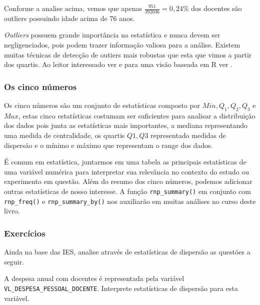 \documentclass[11pt,]{style/krantz}
\renewenvironment{quote}{\begin{VF}}{\end{VF}}
\theoremstyle{definition}
\theoremstyle{definition}
\theoremstyle{definition}
\theoremstyle{remark}
\let\BeginKnitrBlock\begin \let\EndKnitrBlock\end
\begin{document}
Conforme a analise acima, vemos que apenas \(\frac{951}{392036} = 0,24\%\) dos docentes são outliers possuindo idade acima de 76 anos.

\begin{quote}
\emph{Outliers} possuem grande importância na estatística e nunca devem ser negligenciados, pois podem trazer informação valiosa para a análise. Existem muitas técnicas de detecção de outiers mais robustas que esta que vimos a partir dos quartis. Ao leitor interessado ver \citep{barnett1974outliers} e para uma visão baseada em R ver \citep{outliers}.
\end{quote}

\hypertarget{os-cinco-numeros}{%
\subsubsection{Os cinco números}\label{os-cinco-numeros}}

Os cinco números são um conjunto de estatísticas composto por \(Min, Q_1,Q_2,Q_3\) e \(Max\), estas cinco estatísticas costumam ser suficientes para analisar a distribuição dos dados pois junta as estatísticas mais importantes, a mediana representando uma medida de centralidade, os quartis \(Q1,Q3\) representado medidas de dispersão e o mínimo e máximo que representam o range dos dados.

É comum em estatística, juntarmos em uma tabela as principais estatísticas de uma variável numérica para interpretar sua relevância no contexto do estudo ou experimento em questão. Além do resumo dos cinco números, podemos adicionar outras estatísticas de nosso interesse. A função \texttt{rnp\_summary()} em conjunto com \texttt{rnp\_freq()} e \texttt{rnp\_summary\_by()} nos auxiliarão em muitas análises no curso deste livro.

\hypertarget{exercicios-2}{%
\subsubsection{Exercícios}\label{exercicios-2}}

Ainda na base das IES, analise através de estatísticas de dispersão as questões a seguir.

\BeginKnitrBlock{exercise}
\protect\hypertarget{exr:unnamed-chunk-71}{}{\label{exr:unnamed-chunk-71} }A despesa anual com docentes é representada pela variável \texttt{VL\_DESPESA\_PESSOAL\_DOCENTE}. Interprete estatísticas de dispersão para esta variável.
\EndKnitrBlock{exercise}
\end{document}
